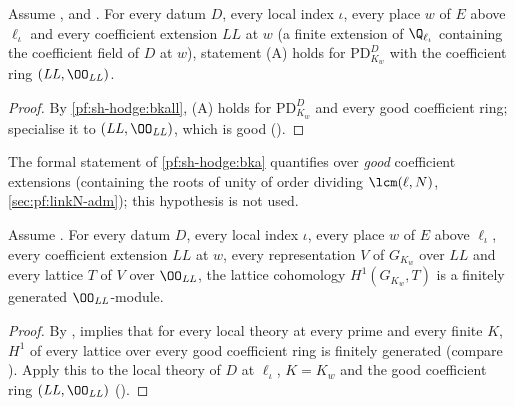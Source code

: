 \begin{corollary}\label{pf:sh-hodge:bka}
Assume \shhodgeBK, \shhodgeLTD{} and \shhodgeLEC. For every datum $D$, every local index $\iota$, every place $w$ of $E$ above
$\ell_\iota$ and every coefficient extension $\mathit{LL}$ at $w$ (a finite extension of $\Q_{\ell_\iota}$ containing the coefficient field
of $D$ at $w$), statement (A) holds for $\mathrm{PD}^D_{K_w}$ with the coefficient ring $(\mathit{LL},\OO_{\mathit{LL}})$.
\end{corollary}

\begin{proof}
By \cref{pf:sh-hodge:bkall}, (A) holds for $\mathrm{PD}^D_{K_w}$ and every good coefficient ring; specialise it to $(\mathit{LL},\OO_{\mathit{LL}})$, which
is good ().
\end{proof}

\begin{remark}
The formal statement of \cref{pf:sh-hodge:bka} quantifies over \emph{good} coefficient extensions (containing the roots of unity of
order dividing $\lcm(\ell,N)$, \cref{sec:pf:linkN-adm}); this hypothesis is not used.
\end{remark}

\begin{proposition}\label{pf:sh-hodge:fin}
Assume \shhodgeLTD. For every datum $D$, every local index $\iota$, every place $w$ of $E$ above $\ell_\iota$, every coefficient
extension $\mathit{LL}$ at $w$, every representation $V$ of $G_{K_w}$ over $\mathit{LL}$ and every lattice $T$ of $V$ over
$\OO_{\mathit{LL}}$, the lattice cohomology $H^1(G_{K_w},T)$ is a finitely generated $\OO_{\mathit{LL}}$-module.
\end{proposition}

\begin{proof}
By , \shhodgeLTD{} implies that for every local theory at every prime and every finite
$K$, $H^1$ of every lattice over every good coefficient ring is finitely generated (compare \cite[Ch.~II, \S5.2]{Serre1997}). Apply
this to the local theory of $D$ at
$\ell_\iota$, $K=K_w$ and the good coefficient ring $(\mathit{LL},\OO_{\mathit{LL}})$
().
\end{proof}

